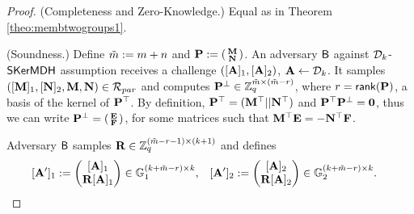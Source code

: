 \begin{proof} (Completeness and Zero-Knowledge.) Equal as in Theorem \ref{theo:membtwogroups1}.

(Soundness.)
Define $\tilde{m}:=m+n$ and $\mathbf{{P}}:=\left(\begin{smallmatrix}\mathbf{{M}}\\\mathbf{{N}}\end{smallmatrix}\right)$. 
An adversary $\mathsf{B}$ against  
$\mathcal{D}_{k}$-$\mathsf{SKerMDH}$ assumption receives a challenge $([\mathbf{{A}}]_1,[\mathbf{{A}}]_2)$, $\mathbf{{A}} \gets \mathcal{D}_k$. 
It samples 
$([\mathbf{{M}}]_1,[\mathbf{{N}}]_2,\mathbf{{M}},\mathbf{{N}}) \in \mathcal{R}_{par}$ and computes  $\mathbf{{P}}^{\perp} \in \mathbb{Z}_q^{\tilde{m} \times (\tilde{m}-r)}$, where $r=\mathsf{rank}(\mathbf{{P}})$, a basis of the kernel of $\mathbf{{P}}^{\top}$. 
By definition, $\mathbf{{P}}^{\top}=(\mathbf{{M}}^{\top} ||\mathbf{{N}}^{\top})$ and $\mathbf{{P}}^{\top}\mathbf{{P}}^{\perp} =\mathbf{{0}}$, thus we can write $\mathbf{{P}}^{\perp}= \left(\begin{smallmatrix}\mathbf{{E}} \\ \mathbf{{F}}\end{smallmatrix}\right)$, for some matrices such that $\mathbf{{M}}^{\top}\mathbf{{E}}=-\mathbf{{N}}^{\top} \mathbf{{F}}$.

Adversary $\mathsf{B}$ samples 
$\mathbf{{R}} \in \mathbb{Z}_q^{(\tilde{m}-r-1) \times (k+1)}$ and defines 
\begin{align*}
&[\mathbf{{A}}']_1:=\begin{pmatrix} [\mathbf{{A}}]_1 \\ \mathbf{{R}} [\mathbf{{A}}]_1 \end{pmatrix} \in \mathbb{G}_1^{(k+\tilde{m}-r) \times k},&
&[\mathbf{{A}}']_2:=\begin{pmatrix} [\mathbf{{A}}]_2 \\ \mathbf{{R}} [\mathbf{{A}}]_2 \end{pmatrix} \in \mathbb{G}_2^{(k+\tilde{m}-r) \times k}.
\end{align*} 


\end{proof}

